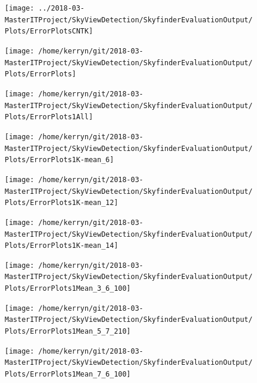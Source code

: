 \documentclass[final,3p,times,authoryear]{elsarticle}
\begin{document}
\begin{figure}
\centering
\texttt{[image: ../2018-03-MasterITProject/SkyViewDetection/SkyfinderEvaluationOutput/Plots/ErrorPlotsCNTK]}
\caption{}
\label{fig:errorplotscntk}
\end{figure}

\begin{figure}
\centering
\texttt{[image: /home/kerryn/git/2018-03-MasterITProject/SkyViewDetection/SkyfinderEvaluationOutput/Plots/ErrorPlots]}
\caption{}
\label{fig:errorplots}
\end{figure}
\begin{figure}
\centering
\texttt{[image: /home/kerryn/git/2018-03-MasterITProject/SkyViewDetection/SkyfinderEvaluationOutput/Plots/ErrorPlots1All]}
\caption{}
\label{fig:errorplots1all}
\end{figure}
\begin{figure}
\centering
\texttt{[image: /home/kerryn/git/2018-03-MasterITProject/SkyViewDetection/SkyfinderEvaluationOutput/Plots/ErrorPlots1K-mean\_6]}
\caption{}
\label{fig:errorplots1k-mean6}
\end{figure}
\begin{figure}
\centering
\texttt{[image: /home/kerryn/git/2018-03-MasterITProject/SkyViewDetection/SkyfinderEvaluationOutput/Plots/ErrorPlots1K-mean\_12]}
\caption{}
\label{fig:errorplots1k-mean12}
\end{figure}
\begin{figure}
\centering
\texttt{[image: /home/kerryn/git/2018-03-MasterITProject/SkyViewDetection/SkyfinderEvaluationOutput/Plots/ErrorPlots1K-mean\_14]}
\caption{}
\label{fig:errorplots1k-mean14}
\end{figure}
\begin{figure}
\centering
\texttt{[image: /home/kerryn/git/2018-03-MasterITProject/SkyViewDetection/SkyfinderEvaluationOutput/Plots/ErrorPlots1Mean\_3\_6\_100]}
\caption{}
\label{fig:errorplots1mean36100}
\end{figure}
\begin{figure}
\centering
\texttt{[image: /home/kerryn/git/2018-03-MasterITProject/SkyViewDetection/SkyfinderEvaluationOutput/Plots/ErrorPlots1Mean\_5\_7\_210]}
\caption{}
\label{fig:errorplots1mean57210}
\end{figure}
\begin{figure}
\centering
\texttt{[image: /home/kerryn/git/2018-03-MasterITProject/SkyViewDetection/SkyfinderEvaluationOutput/Plots/ErrorPlots1Mean\_7\_6\_100]}
\caption{}
\label{fig:errorplots1mean76100}
\end{figure}
\end{document}

